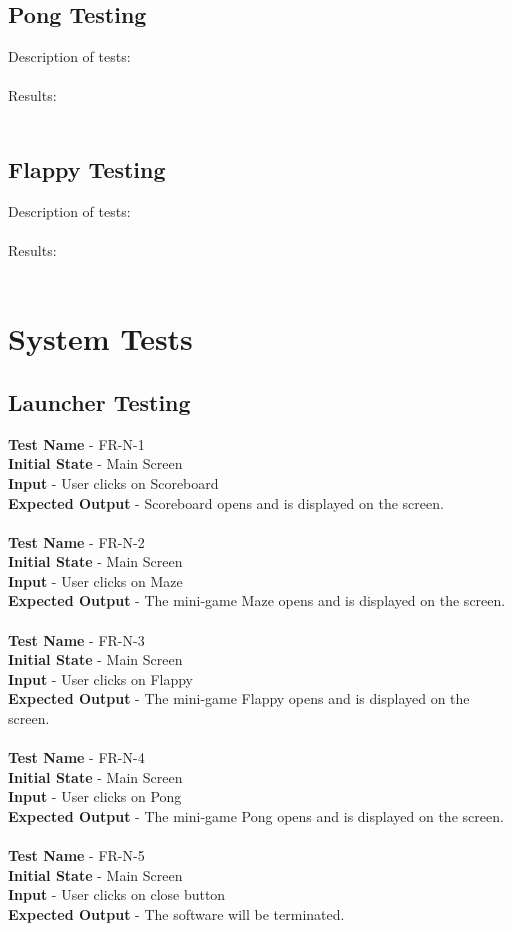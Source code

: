 \documentclass[12pt, titlepage]{article}
\begin{document}
	\subsection{Pong Testing}
		Description of tests: \\ \\
		Results: \\ \\
		
	\subsection{Flappy Testing}
		Description of tests: \\ \\
		Results: \\ \\
		
\section{System Tests}

\subsection{Launcher Testing}

\textbf{Test Name} - FR-N-1\\
\textbf{Initial State} - Main Screen\\
\textbf{Input} - User clicks on Scoreboard\\
\textbf{Expected Output} - Scoreboard opens and is displayed on the screen.\\ \\
\textbf{Test Name} - FR-N-2\\
\textbf{Initial State} - Main Screen\\
\textbf{Input} - User clicks on Maze\\
\textbf{Expected Output} - The mini-game Maze opens and is displayed on the screen.\\ \\
\textbf{Test Name} - FR-N-3\\
\textbf{Initial State} - Main Screen\\
\textbf{Input} - User clicks on Flappy\\
\textbf{Expected Output} - The mini-game Flappy opens and is displayed on the screen.\\ \\
\textbf{Test Name} - FR-N-4\\
\textbf{Initial State} - Main Screen\\
\textbf{Input} - User clicks on Pong\\
\textbf{Expected Output} - The mini-game Pong opens and is displayed on the screen.\\ \\
\textbf{Test Name} - FR-N-5\\
\textbf{Initial State} - Main Screen\\
\textbf{Input} - User clicks on close button\\
\textbf{Expected Output} - The software will be terminated.\\ \\
\end{document}
